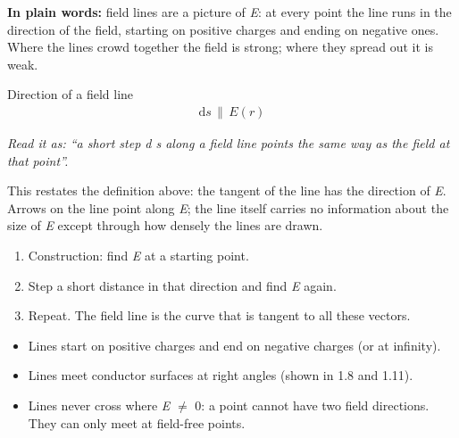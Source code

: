 \documentclass[11pt]{article}
\begin{document}
\begin{keepsection}
\begin{center}
\begin{minipage}[t]{0.950\linewidth}
\par{}\end{minipage}
\end{center}

\begin{plainbox}\textbf{In plain words:} field lines are a picture of \textit{E}: at every point the line runs in the direction of the field, starting on positive charges and ending on negative ones. Where the lines crowd together the field is strong; where they spread out it is weak.\end{plainbox}

\begin{equationcard}{Direction of a field line}
\[ \begin{gathered} \mathrm{d}{s}\, \parallel \, {E}({r}) \end{gathered} \]
{\small \emph{Read it as: “a short step d s along a field line points the same way as the field at that point”.}\par This restates the definition above: the tangent of the line has the direction of \textit{E}. Arrows on the line point along \textit{E}; the line itself carries no information about the size of \textit{E} except through how densely the lines are drawn.}
\end{equationcard}

\begin{enumerate}
\item Construction: find \textit{E} at a starting point.
\item Step a short distance in that direction and find \textit{E} again.
\item Repeat. The field line is the curve that is tangent to all these vectors.
\end{enumerate}

\begin{itemize}
\item Lines start on positive charges and end on negative charges (or at infinity).
\item Lines meet conductor surfaces at right angles (shown in 1.8 and 1.11).
\item Lines never cross where \textit{E} \ensuremath{\neq} 0: a point cannot have two field directions. They can only meet at field-free points.
\end{itemize}


\end{keepsection}
\end{document}
